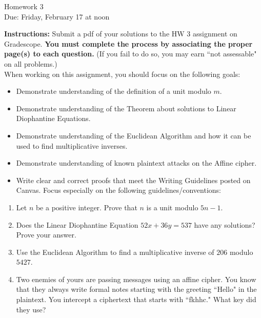 \documentclass[12pt]{article}
\begin{document}
\begin{center}
{\Large Homework 3}\\
Due: Friday,  February 17 at noon\\


\end{center}
{\bf Instructions:} Submit a pdf of your solutions to the HW 3 assignment on Gradescope.  {\bf You must complete the process by associating the proper page(s) to each question.} (If you fail to do so, you may earn ``not assessable" on all problems.)\\[3pt]

\noindent When working on this assignment, you should focus on the following goals:
\begin{itemize}
\item Demonstrate understanding of the definition of a unit modulo $m$.  
\item Demonstrate understanding of the Theorem about solutions to Linear Diophantine Equations.
\item Demonstrate understanding of the Euclidean Algorithm and how it can be used to find multiplicative inverses.
\item Demonstrate understanding of known plaintext attacks on the Affine cipher. 
\item Write clear and correct proofs that meet the Writing Guidelines posted on Canvas. Focus especially on the following guidelines/conventions:
\end{itemize}

\begin{enumerate}

\item Let $n$ be a positive integer. Prove that $n$ is a unit modulo $5n-1$. 
\item Does the Linear Diophantine Equation $52x+36y=537$ have any solutions? Prove your answer.

\item Use the Euclidean Algorithm to find a multiplicative inverse of $206$ modulo $5427$. 

\item Two enemies of yours are passing messages using an affine cipher. You know that they always write formal notes starting with the greeting ``Hello" in the plaintext.  You intercept a ciphertext that starts with ``fkhhc." What key did they use?


\end{enumerate}
\end{document}
